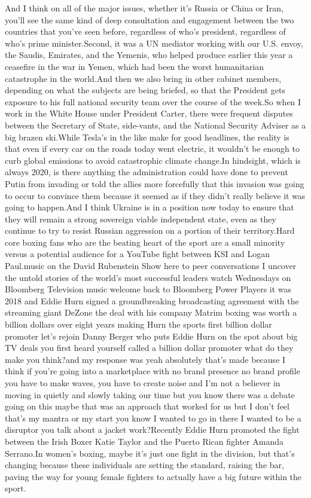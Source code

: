\documentclass{article}%
\begin{document}
And I think on all of the major issues, whether it's Russia or China or Iran, you'll see the same kind of deep consultation and engagement between the two countries that you've seen before, regardless of who's president, regardless of who's prime minister.Second, it was a UN mediator working with our U.S. envoy, the Saudis, Emirates, and the Yemenis, who helped produce earlier this year a ceasefire in the war in Yemen, which had been the worst humanitarian catastrophe in the world.And then we also bring in other cabinet members, depending on what the subjects are being briefed, so that the President gets exposure to his full national security team over the course of the week.So when I work in the White House under President Carter, there were frequent disputes between the Secretary of State, side{-}vants, and the National Security Adviser as a big brazen ski.While Tesla's in the like make for good headlines, the reality is that even if every car on the roads today went electric, it wouldn't be enough to curb global emissions to avoid catastrophic climate change.In hindsight, which is always 2020, is there anything the administration could have done to prevent Putin from invading or told the allies more forcefully that this invasion was going to occur to convince them because it seemed as if they didn't really believe it was going to happen.And I think Ukraine is in a position now today to ensure that they will remain a strong sovereign viable independent state, even as they continue to try to resist Russian aggression on a portion of their territory.Hard core boxing fans who are the beating heart of the sport are a small minority versus a potential audience for a YouTube fight between KSI and Logan Paul.music on the David Rubenstein Show here to peer conversations I uncover the untold stories of the world's most successful leaders watch Wednesdays on Bloomberg Television music welcome back to Bloomberg Power Players it was 2018 and Eddie Hurn signed a groundbreaking broadcasting agreement with the streaming giant DeZone the deal with his company Matrim boxing was worth a billion dollars over eight years making Hurn the sports first billion dollar promoter let's rejoin Danny Berger who puts Eddie Hurn on the spot about big TV deals you first heard yourself called a billion dollar promoter what do they make you think?and my response was yeah absolutely that's made because I think if you're going into a marketplace with no brand presence no brand profile you have to make waves, you have to create noise and I'm not a believer in moving in quietly and slowly taking our time but you know there was a debate going on this maybe that was an approach that worked for us but I don't feel that's my mantra or my start you know I wanted to go in there I wanted to be a disruptor you talk about a jacket work?Recently Eddie Hurn promoted the fight between the Irish Boxer Katie Taylor and the Puerto Rican fighter Amanda Serrano.In women's boxing, maybe it's just one fight in the division, but that's changing because these individuals are setting the standard, raising the bar, paving the way for young female fighters to actually have a big future within the sport.%
\end{document}
